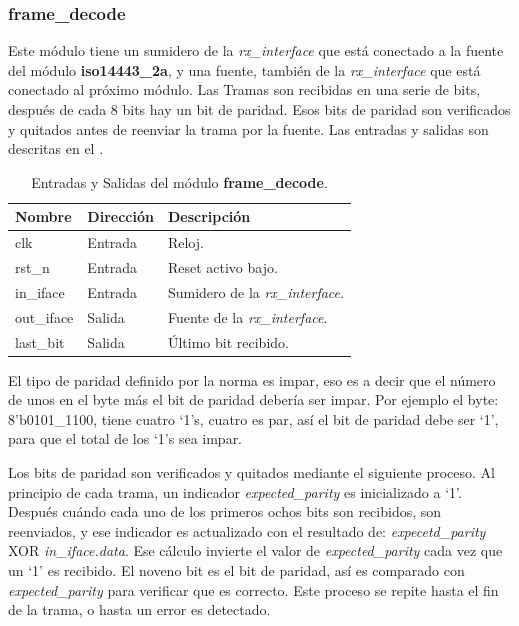 \documentclass[a4paper, twoside, 11pt]{report}
\begin{document}
\FloatBarrier
\subsubsection{frame\_decode}

Este módulo tiene un sumidero de la \textit{rx\_interface} que está conectado a la fuente del módulo \textbf{iso14443\_2a}, y una fuente, también de la \textit{rx\_interface} que está conectado al próximo módulo. Las Tramas son recibidas en una serie de bits, después de cada 8 bits hay un bit de paridad. Esos bits de paridad son verificados y quitados antes de reenviar la trama por la fuente. Las entradas y salidas son descritas en el .

\begin{table}[htb]
  \centering
  \tablezebra
  \begin{tabulary}{\linewidth}{l|l|L}
    \setcounter{rownum}{0}
    \textbf{Nombre}&\textbf{Dirección}&\textbf{Descripción} \\
    \hline
    clk&Entrada&Reloj. \\
    rst\_n&Entrada&Reset activo bajo. \\
    in\_iface&Entrada&Sumidero de la \textit{rx\_interface}. \\
    out\_iface&Salida&Fuente de la \textit{rx\_interface}. \\
    last\_bit&Salida&Último bit recibido. \\
  \end{tabulary}
  \caption{Entradas y Salidas del módulo \textbf{frame\_decode}.}
  \label{tab:ports_frame_decode}
\end{table}

El tipo de paridad definido por la norma es impar, eso es a decir que el número de unos en el byte más el bit de paridad debería ser impar. Por ejemplo el byte: 8’b0101\_1100, tiene cuatro ‘1’s, cuatro es par, así el bit de paridad debe ser ‘1’, para que el total de los ‘1’s sea impar.

Los bits de paridad son verificados y quitados mediante el siguiente proceso. Al principio de cada trama, un indicador \textit{expected\_parity} es inicializado a ‘1’. Después cuándo cada uno de los primeros ochos bits son recibidos, son reenviados, y ese indicador es actualizado con el resultado de: \textit{expecetd\_parity} XOR \textit{in\_iface.data}. Ese cálculo invierte el valor de \textit{expected\_parity} cada vez que un ‘1’ es recibido. El noveno bit es el bit de paridad, así es comparado con \textit{expected\_parity} para verificar que es correcto. Este proceso se repite hasta el fin de la trama, o hasta un error es detectado.
\end{document}
